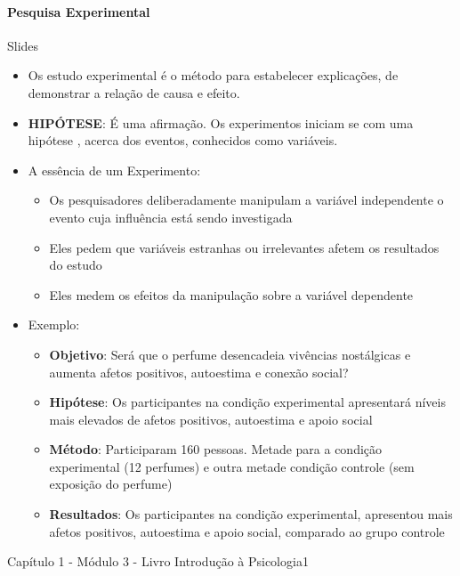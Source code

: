 \documentclass[
]{book}
\providecommand{\tightlist}{%
  \setlength{\itemsep}{0pt}\setlength{\parskip}{0pt}}
\begin{document}
\hypertarget{pesquisa-experimental}{%
\paragraph{Pesquisa Experimental}\label{pesquisa-experimental}}

Slides

\begin{itemize}
\tightlist
\item
  Os estudo experimental é o método para estabelecer explicações, de
  demonstrar a relação de causa e efeito.
\item
  \textbf{HIPÓTESE}: É uma afirmação. Os experimentos iniciam se com uma
  hipótese , acerca dos eventos, conhecidos como variáveis.
\item
  A essência de um Experimento:

  \begin{itemize}
  \tightlist
  \item
    Os pesquisadores deliberadamente manipulam a variável independente o
    evento cuja influência está sendo investigada
  \item
    Eles pedem que variáveis estranhas ou irrelevantes afetem os
    resultados do estudo
  \item
    Eles medem os efeitos da manipulação sobre a variável dependente
  \end{itemize}
\item
  Exemplo:

  \begin{itemize}
  \tightlist
  \item
    \textbf{Objetivo}: Será que o perfume desencadeia vivências
    nostálgicas e aumenta afetos positivos, autoestima e conexão social?
  \item
    \textbf{Hipótese}: Os participantes na condição experimental
    apresentará níveis mais elevados de afetos positivos, autoestima e
    apoio social
  \item
    \textbf{Método}: Participaram 160 pessoas. Metade para a condição
    experimental (12 perfumes) e outra metade condição controle (sem
    exposição do perfume)
  \item
    \textbf{Resultados}: Os participantes na condição experimental,
    apresentou mais afetos positivos, autoestima e apoio social,
    comparado ao grupo controle
  \end{itemize}
\end{itemize}

Capítulo 1 - Módulo 3 - Livro Introdução à Psicologia1
\end{document}
